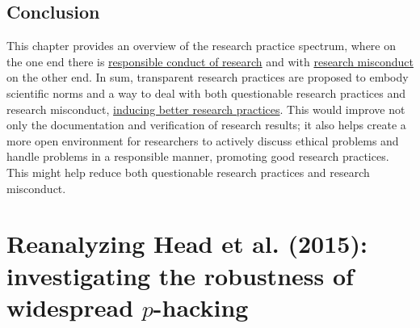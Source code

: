 \documentclass[a5paper]{book}
\begin{document}
\section{Conclusion}\label{conclusion}

This chapter provides an overview of the research practice spectrum,
where on the one end there is
\protect\hyperlink{responsible-conduct-of-research}{responsible conduct
of research} and with \protect\hyperlink{research-misconduct}{research
misconduct} on the other end. In sum, transparent research practices are
proposed to embody scientific norms and a way to deal with both
questionable research practices and research misconduct,
\protect\hyperlink{improving-responsible-conduct}{inducing better
research practices}. This would improve not only the documentation and
verification of research results; it also helps create a more open
environment for researchers to actively discuss ethical problems and
handle problems in a responsible manner, promoting good research
practices. This might help reduce both questionable research practices
and research misconduct.

\chapter{\texorpdfstring{Reanalyzing Head et al. (2015): investigating
the robustness of widespread
\(p\)-hacking}{Reanalyzing Head et al. (2015): investigating the robustness of widespread p-hacking}}\label{reanalyzing-head-et-al.-2015-investigating-the-robustness-of-widespread-p-hacking}
\end{document}
